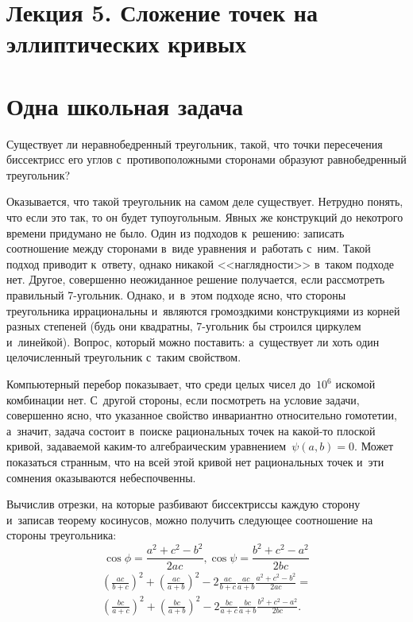\documentclass{article}
\begin{document}
\section*{Лекция 5. Сложение точек на эллиптических кривых}
\resetcntrs

\section{Одна школьная задача}

\begin{problem}
  Существует ли неравнобедренный треугольник, такой, что точки пересечения
  биссектрисс его углов с~противоположными сторонами образуют равнобедренный
  треугольник?
\end{problem}

Оказывается, что такой треугольник на самом деле существует. Нетрудно понять,
что если это так, то он будет тупоугольным. Явных же конструкций до некотрого
времени придумано не было. Один из подходов к~решению: записать соотношение
между сторонами в~виде уравнения и~работать с~ним. Такой подход приводит
к~ответу, однако никакой <<наглядности>> в~таком подходе нет. Другое, совершенно
неожиданное решение получается, если рассмотреть правильный 7-угольник.
Однако, и~в~этом подходе ясно, что стороны треугольника иррациональны и~являются
громоздкими конструкциями из корней разных степеней (будь они квадратны,
7-угольник бы строился циркулем и~линейкой). Вопрос, который можно поставить:
а~существует ли хоть один целочисленный треугольник с~таким свойством.

Компьютерный перебор показывает, что среди целых чисел до~$10^6$ искомой
комбинации нет. С~другой стороны, если посмотреть на условие задачи, совершенно
ясно, что указанное свойство инвариантно относительно гомотетии, а~значит,
задача состоит в~поиске рациональных точек на какой-то плоской кривой,
задаваемой каким-то алгебраическим уравнением~$\psi(a, b) = 0$. Может показаться
странным, что на всей этой кривой нет рациональных точек и~эти сомнения
оказываются небеспочвенны.

Вычислив отрезки, на которые разбивают биссектриссы каждую сторону и~записав
теорему косинусов, можно получить следующее соотношение на стороны треугольника:
$$\cos\phi = \frac{a^2 + c^2 - b^2}{2ac},
\cos\psi = \frac{b^2 + c^2 - a^2}{2bc}$$
\begin{multline*}
  \left(\frac{ac}{b+c}\right)^2+\left(\frac{ac}{a+b}\right)^2 -
  2\frac{ac}{b+c}\frac{ac}{a+b}\frac{a^2 + c^2 - b^2}{2ac} = \\
  \left(\frac{bc}{a+c}\right)^2+\left(\frac{bc}{a+b}\right)^2 -
  2\frac{bc}{a+c}\frac{bc}{a+b}\frac{b^2 + c^2 - a^2}{2bc}.
\end{multline*}
\end{document}
